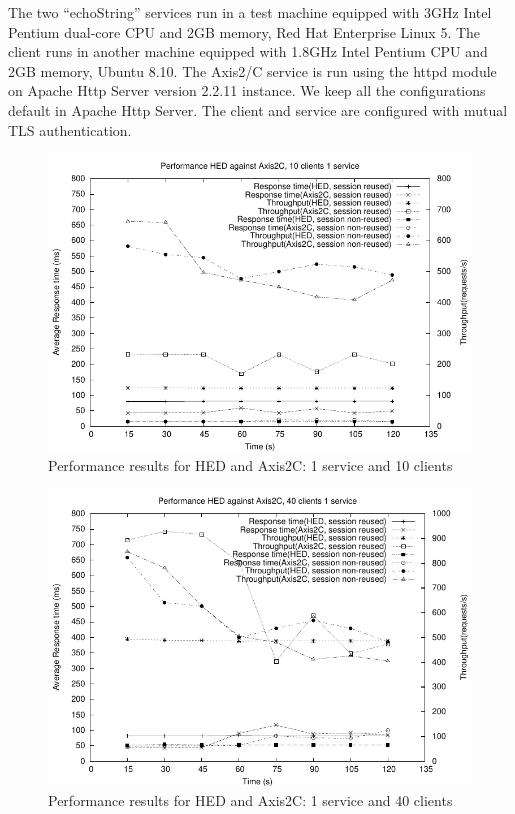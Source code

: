 \documentclass[conference]{IEEEtran}
\begin{document}
The two ``echoString'' services run in a test machine equipped with 3GHz Intel Pentium dual-core 
CPU and 2GB memory, Red Hat Enterprise Linux 5. The client runs in another machine equipped 
with 1.8GHz Intel Pentium CPU and 2GB memory, Ubuntu 8.10. The Axis2/C service is run using 
the httpd module on Apache Http Server version 2.2.11 instance. We keep all the configurations 
default in Apache Http Server. The client and service are configured with mutual TLS authentication.

\begin{figure}
\includegraphics[width=0.9\columnwidth]{HED2Axis_thread10.pdf}
\caption{Performance results for HED and Axis2C: 1 service and 10 clients}
\label{fig:HED2Axis_thread10}
\end{figure}

\begin{figure}
\includegraphics[width=0.9\columnwidth]{HED2Axis_thread40.pdf}
\caption{Performance results for HED and Axis2C: 1 service and 40 clients}
\label{fig:HED2Axis_thread40}
\end{figure}
\end{document}
